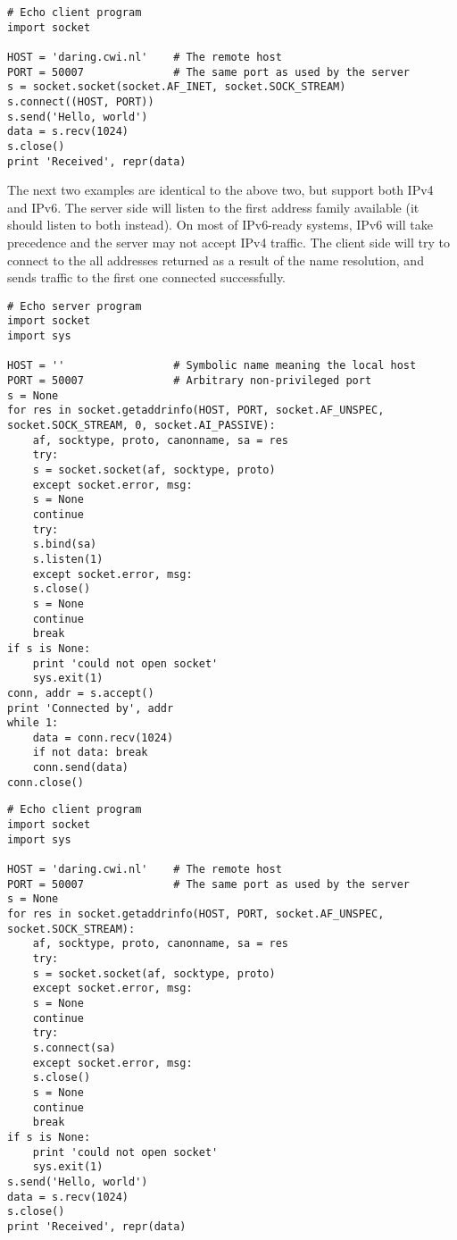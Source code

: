 \begin{verbatim}
# Echo client program
import socket

HOST = 'daring.cwi.nl'    # The remote host
PORT = 50007              # The same port as used by the server
s = socket.socket(socket.AF_INET, socket.SOCK_STREAM)
s.connect((HOST, PORT))
s.send('Hello, world')
data = s.recv(1024)
s.close()
print 'Received', repr(data)
\end{verbatim}

The next two examples are identical to the above two, but support both
IPv4 and IPv6.
The server side will listen to the first address family available
(it should listen to both instead).
On most of IPv6-ready systems, IPv6 will take precedence
and the server may not accept IPv4 traffic.
The client side will try to connect to the all addresses returned as a result
of the name resolution, and sends traffic to the first one connected
successfully.

\begin{verbatim}
# Echo server program
import socket
import sys

HOST = ''                 # Symbolic name meaning the local host
PORT = 50007              # Arbitrary non-privileged port
s = None
for res in socket.getaddrinfo(HOST, PORT, socket.AF_UNSPEC, socket.SOCK_STREAM, 0, socket.AI_PASSIVE):
    af, socktype, proto, canonname, sa = res
    try:
	s = socket.socket(af, socktype, proto)
    except socket.error, msg:
	s = None
	continue
    try:
	s.bind(sa)
	s.listen(1)
    except socket.error, msg:
	s.close()
	s = None
	continue
    break
if s is None:
    print 'could not open socket'
    sys.exit(1)
conn, addr = s.accept()
print 'Connected by', addr
while 1:
    data = conn.recv(1024)
    if not data: break
    conn.send(data)
conn.close()
\end{verbatim}

\begin{verbatim}
# Echo client program
import socket
import sys

HOST = 'daring.cwi.nl'    # The remote host
PORT = 50007              # The same port as used by the server
s = None
for res in socket.getaddrinfo(HOST, PORT, socket.AF_UNSPEC, socket.SOCK_STREAM):
    af, socktype, proto, canonname, sa = res
    try:
	s = socket.socket(af, socktype, proto)
    except socket.error, msg:
	s = None
	continue
    try:
	s.connect(sa)
    except socket.error, msg:
	s.close()
	s = None
	continue
    break
if s is None:
    print 'could not open socket'
    sys.exit(1)
s.send('Hello, world')
data = s.recv(1024)
s.close()
print 'Received', repr(data)
\end{verbatim}
